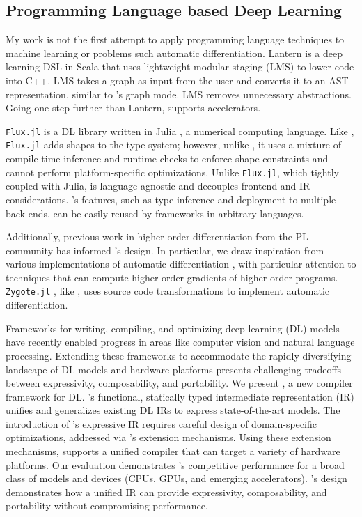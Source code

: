 \subsection{Programming Language based Deep Learning}

My work is not the first attempt to apply programming language
    techniques to machine learning or problems such automatic differentiation.
Lantern \cite{lantern} is a deep learning DSL in Scala
    that uses lightweight modular staging (LMS) to lower code into C++.
LMS takes a graph as input from the user and converts it to an AST
    representation, similar to \relay's graph mode.
LMS removes unnecessary abstractions.
Going one step further than Lantern,
    \relay supports accelerators.

\verb|Flux.jl| \cite{fluxjl} is a DL library written in Julia \cite{julia}, a numerical
computing language. Like \relay, \verb|Flux.jl| adds shapes to the type system; however, unlike \relay, it
uses a mixture of compile-time inference and runtime checks to enforce shape constraints
\cite{jlmlpl} and cannot perform platform-specific optimizations. Unlike \verb|Flux.jl|, which
tightly coupled with Julia, \relay is language agnostic and decouples frontend and IR
considerations.
\relay's features, such as type inference and deployment to multiple back-ends, can
    be easily reused by frameworks in arbitrary languages.

Additionally, previous work in higher-order differentiation from the PL community
has informed \relay's design.
In particular, we draw inspiration from various implementations of
automatic differentiation \cite{beautiful_diff, ad_survey, haskell_ad, toplas_reverse, wang_reverse, DLS, DDF},
with particular attention to techniques that can compute higher-order gradients of higher-order programs.
\verb|Zygote.jl| \cite{zygotejl}, like \relay, uses source code transformations to
    implement automatic differentiation.


Frameworks for writing, compiling, and optimizing
  deep learning (DL) models have recently
  enabled progress in areas like computer
  vision and natural language processing.
Extending these frameworks to accommodate
  the rapidly diversifying landscape of
  DL models and hardware platforms presents
  challenging tradeoffs between
  expressivity, composability, and portability.
We present \relay,
  a new compiler framework for DL.
\relay's functional, statically typed intermediate representation (IR)
  unifies and generalizes existing DL IRs
  to express state-of-the-art models.
The introduction of \relay's expressive IR requires
  careful design of domain-specific optimizations,
  addressed via \relay's extension mechanisms.
Using these extension mechanisms,
  \relay supports a unified compiler that
  can target a variety of hardware platforms.
Our evaluation demonstrates \relay's competitive performance for a
  broad class of models and devices
  (CPUs, GPUs, and emerging accelerators).
\relay's design demonstrates how a unified IR can provide
  expressivity, composability, and portability
  without compromising performance.


